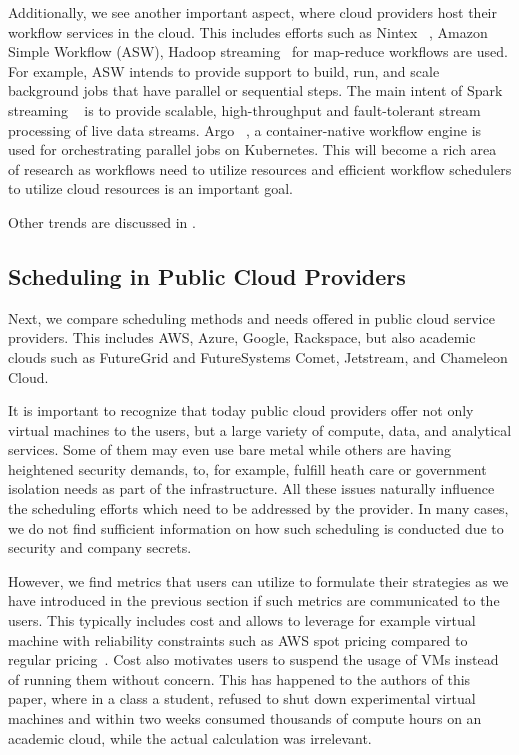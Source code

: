 \documentclass[final,5p,times,twocolumn]{elsarticle}
\begin{document}
Additionally, we see another important aspect, where cloud providers host their workflow services in the cloud. This includes efforts such as Nintex ~\cite{www-nintex-wf}, Amazon Simple Workflow (ASW), Hadoop streaming~\cite{www-hadoop-streaming} for map-reduce workflows are used. For example, ASW intends to provide support to build, run, and scale background jobs that have parallel or sequential steps. The main intent of Spark streaming ~\cite{www-spark-streaming} is to provide scalable, high-throughput and fault-tolerant stream processing of live data streams. Argo ~\cite{www-argo-wf}, a container-native workflow engine is used for orchestrating parallel jobs on Kubernetes. This will become a rich area of research as workflows need to utilize resources and efficient workflow schedulers to utilize cloud resources is an important goal.

Other trends are discussed in \cite{data-aware-scheduling,workflow-scheduling-cloud,}.




\subsection{Scheduling in Public Cloud Providers}
\label{sec:public}

Next, we compare scheduling methods and needs offered in public cloud service providers. This includes AWS, Azure, Google, Rackspace, but also academic clouds such as FutureGrid and FutureSystems Comet, Jetstream, and Chameleon Cloud.

It is important to recognize that today public cloud providers offer not only virtual machines to the users, but a large variety of compute, data, and analytical services. Some of them may even use bare metal while others are having heightened security demands, to, for example, fulfill heath care or government isolation needs as part of the infrastructure. All these issues naturally influence the scheduling efforts which need to be addressed by the provider. In many cases, we do not find sufficient information on how such scheduling is conducted due to security and company secrets.

However, we find metrics that users can utilize to formulate their strategies as we have introduced in the previous section if such metrics are communicated to the users. This typically includes cost and allows to leverage for example virtual machine with reliability constraints such as AWS spot pricing compared to regular pricing~\cite{AmazonEC22015}. Cost also motivates users to suspend the usage of VMs instead of running them without concern. This has happened to the authors of this paper, where in a class a student, refused to shut down experimental virtual machines and within two weeks consumed thousands of compute hours on an academic cloud, while the actual calculation was irrelevant.
\end{document}
